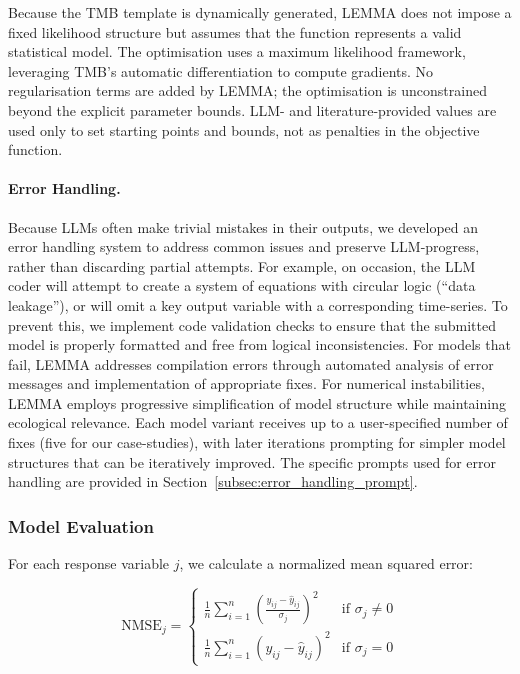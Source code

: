 Because the TMB template is dynamically generated, LEMMA does not impose a fixed likelihood structure but assumes that the function represents a valid statistical model. The optimisation uses a maximum likelihood framework, leveraging TMB’s automatic differentiation to compute gradients. No regularisation terms are added by LEMMA; the optimisation is unconstrained beyond the explicit parameter bounds. LLM- and literature-provided values are used only to set starting points and bounds, not as penalties in the objective function.

\paragraph{Error Handling.}
Because LLMs often make trivial mistakes in their outputs, we developed an error handling system to address common issues and preserve LLM-progress, rather than discarding partial attempts. For example, on occasion, the LLM coder will attempt to create a system of equations with circular logic (``data leakage''), or will omit a key output variable with a corresponding time-series. To prevent this, we implement code validation checks to ensure that the submitted model is properly formatted and free from logical inconsistencies. For models that fail, LEMMA addresses compilation errors through automated analysis of error messages and implementation of appropriate fixes. For numerical instabilities, LEMMA employs progressive simplification of model structure while maintaining ecological relevance. Each model variant receives up to a user-specified number of fixes (five for our case-studies), with later iterations prompting for simpler model structures that can be iteratively improved. The specific prompts used for error handling are provided in Section~\ref{subsec:error_handling_prompt}.

\subsubsection{Model Evaluation}

For each response variable $j$, we calculate a normalized mean squared error:

\begin{equation}
    \text{NMSE}_j = \begin{cases}
        \frac{1}{n} \sum_{i=1}^{n} \left(\frac{y_{ij} - \hat{y}_{ij}}{\sigma_j}\right)^2 & \text{if } \sigma_j \neq 0 \\
        \frac{1}{n} \sum_{i=1}^{n} (y_{ij} - \hat{y}_{ij})^2 & \text{if } \sigma_j = 0
    \end{cases}
\end{equation}

